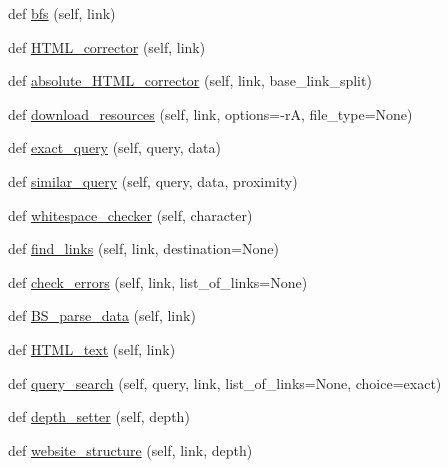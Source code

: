 \begin{DoxyCompactItemize}
\item 
def \hyperlink{class_web___crawler_1_1_web___crawler_a993dac4217f67db152c76c12a2ff9c71}{bfs} (self, link)
\item 
def \hyperlink{class_web___crawler_1_1_web___crawler_a57c901dcd313805cfaf436d005d3c79a}{H\+T\+M\+L\+\_\+corrector} (self, link)
\item 
def \hyperlink{class_web___crawler_1_1_web___crawler_a793dce384c5f064f0fd0974cacb8472c}{absolute\+\_\+\+H\+T\+M\+L\+\_\+corrector} (self, link, base\+\_\+link\+\_\+split)
\item 
def \hyperlink{class_web___crawler_1_1_web___crawler_aacd07e47dfe26cad9229bdc576017c04}{download\+\_\+resources} (self, link, options=\textquotesingle{}-\/rA\textquotesingle{}, file\+\_\+type=None)
\item 
def \hyperlink{class_web___crawler_1_1_web___crawler_afed56534dbc43008f574caad90e0bc68}{exact\+\_\+query} (self, query, data)
\item 
def \hyperlink{class_web___crawler_1_1_web___crawler_a1981e0ead7b4b5b9d3cce3524bb05ebe}{similar\+\_\+query} (self, query, data, proximity)
\item 
def \hyperlink{class_web___crawler_1_1_web___crawler_ac8850d91b2011b6f490d711033e8f191}{whitespace\+\_\+checker} (self, character)
\item 
def \hyperlink{class_web___crawler_1_1_web___crawler_ae2af5c93ae51acf52f8e7efdabab8206}{find\+\_\+links} (self, link, destination=None)
\item 
def \hyperlink{class_web___crawler_1_1_web___crawler_ab027bb04acd098be1ad92d2908f71416}{check\+\_\+errors} (self, link, list\+\_\+of\+\_\+links=None)
\item 
def \hyperlink{class_web___crawler_1_1_web___crawler_abf9ad792a7e19afa406cf793c31f8299}{B\+S\+\_\+parse\+\_\+data} (self, link)
\item 
def \hyperlink{class_web___crawler_1_1_web___crawler_a7353f65405aef84af008bd8fc1eef4f6}{H\+T\+M\+L\+\_\+text} (self, link)
\item 
def \hyperlink{class_web___crawler_1_1_web___crawler_a373e84e41929ee530d250451efbfbc38}{query\+\_\+search} (self, query, link, list\+\_\+of\+\_\+links=None, choice=\textquotesingle{}exact\textquotesingle{})
\item 
def \hyperlink{class_web___crawler_1_1_web___crawler_a7c800e5bc75c0172500fe2d77154a3e7}{depth\+\_\+setter} (self, depth)
\item 
def \hyperlink{class_web___crawler_1_1_web___crawler_a568ddfd327450f38b5b3e8db2355131c}{website\+\_\+structure} (self, link, depth)
\end{DoxyCompactItemize}
